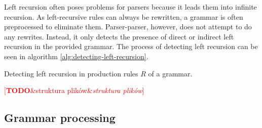 \documentclass[english,engineering]{wizthesis}
\newcommand{\todo}[1]{%
  \textcolor{red}{[\textbf{TODO}\ifx&#1&{}\else{ }\fi\emph{#1}]}%
}
\newcommand{\paraphrase}[1]{#1}
\newcommand{\thisproject}{Parser-parser}
\begin{document}
\paraphrase{Left recursion often poses problems for parsers because it leads
them into infinite recursion. As left-recursive rules can always be rewritten, a
grammar is often preprocessed to eliminate them.} \thisproject{},
however, does not attempt to do any rewrites. Instead, it only detects the
presence of direct or indirect left recursion in the provided grammar. The
process of detecting left recursion can be seen in algorithm
\ref{alg:detecting-left-recursion}.

\begin{algorithm}[ht]
  \DontPrintSemicolon
  \LinesNumbered

  \caption{Detecting left recursion in production rules $R$ of a grammar.}
  \label{alg:detecting-left-recursion}
\end{algorithm}

\todo{struktura plików}

\subsection{Grammar processing}
\end{document}
